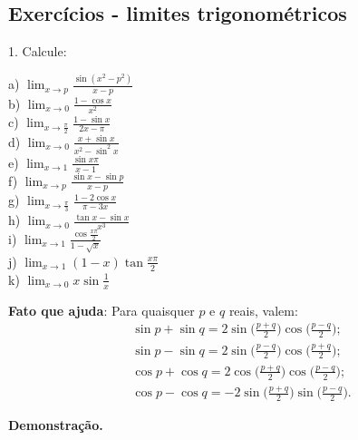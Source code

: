 \documentclass{article}
\begin{document}
{\begin{newpage}
\subsection{Exercícios - limites trigonométricos}
\begin{flushleft}
1. Calcule:
\end{flushleft}
\par
\begin{multicols}{4}
\hspace{-15pt}a) $\displaystyle{\lim_{x\to p}} \frac{\sin{(x^2 - p^2)}}{x-p}$ \\
b) $\displaystyle{\lim_{x\to 0}} \frac{1 - \cos{x}}{x^2}$\\
c) $\displaystyle{\lim_{x\to \frac{\pi }{2}}} \frac{1 - \sin{x}}{2x-\pi }$\\
d) $\displaystyle{\lim_{x\to 0}} \frac{x + \sin{x}}{x^2 - \sin^{2}{x}}$\\
e) $\displaystyle{\lim_{x\to 1}} \frac{\sin{x\pi }}{x-1}$\\
f) $\displaystyle{\lim_{x\to p}} \frac{\sin{x} - \sin{p}}{x-p}$\\
g) $\displaystyle{\lim_{x\to \frac{\pi }{3}}} \frac{1 - 2\cos{x}}{\pi - 3x}$\\
h) $\displaystyle{\lim_{x\to 0}} \frac{\tan{x} - \sin{x}}{x^3}$\\
i) $\displaystyle{\lim_{x\to 1}} \frac{\cos{\frac{x\pi }{2}}}{1 - \sqrt{x}}$\\
j) $\displaystyle{\lim_{x\to 1}} (1-x)\tan{\frac{x\pi }{2}}$\\
k) $\displaystyle{\lim_{x\to 0}} x\sin{\frac{1}{x}}$\\
\end{multicols}
\vspace{0.3cm}
\par
\textbf{Fato que ajuda}: Para quaisquer $p$ e $q$ reais, valem:
\begin{equation*}
\begin{split}
&\sin{p} + \sin{q} = 2\sin{\Big(\frac{p+q}{2}\Big)} \cos{\Big(\frac{p-q}{2}\Big)}; \\
&\sin{p} - \sin{q} = 2\sin{\Big(\frac{p-q}{2}\Big)} \cos{\Big(\frac{p+q}{2}\Big)}; \\
&\cos{p} + \cos{q} = 2\cos{\Big(\frac{p+q}{2}\Big)} \cos{\Big(\frac{p-q}{2}\Big)}; \\
&\cos{p} - \cos{q} = -2\sin{\Big(\frac{p+q}{2}\Big)} \sin{\Big(\frac{p-q}{2}\Big)}.
\end{split}
\end{equation*}
\par \textbf{Demonstração.}

\end{newpage}}
\end{document}
